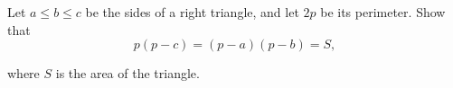Let $ a\le b\le c$ be the sides of a right triangle, and let $ 2p$ be its perimeter. Show that\[ p(p - c) = (p - a)(p - b) = S,

\]

where $ S$ is the area of the triangle.